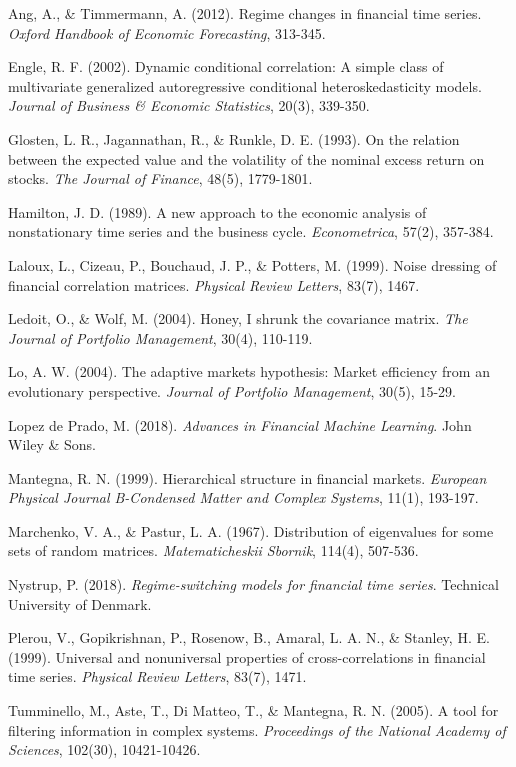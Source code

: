 \documentclass[
  12pt,
]{article}
\begin{document}
\begingroup
\setlength{\parindent}{-0.5in}
\setlength{\leftskip}{0.5in}
\setlength{\parskip}{8pt}

Ang, A., \& Timmermann, A. (2012). Regime changes in financial time
series. \emph{Oxford Handbook of Economic Forecasting}, 313-345.

Engle, R. F. (2002). Dynamic conditional correlation: A simple class of
multivariate generalized autoregressive conditional heteroskedasticity
models. \emph{Journal of Business \& Economic Statistics}, 20(3),
339-350.

Glosten, L. R., Jagannathan, R., \& Runkle, D. E. (1993). On the
relation between the expected value and the volatility of the nominal
excess return on stocks. \emph{The Journal of Finance}, 48(5),
1779-1801.

Hamilton, J. D. (1989). A new approach to the economic analysis of
nonstationary time series and the business cycle. \emph{Econometrica},
57(2), 357-384.

Laloux, L., Cizeau, P., Bouchaud, J. P., \& Potters, M. (1999). Noise
dressing of financial correlation matrices.
\emph{Physical Review Letters}, 83(7), 1467.

Ledoit, O., \& Wolf, M. (2004). Honey, I shrunk the covariance matrix.
\emph{The Journal of Portfolio Management}, 30(4), 110-119.

Lo, A. W. (2004). The adaptive markets hypothesis: Market efficiency
from an evolutionary perspective.
\emph{Journal of Portfolio Management}, 30(5), 15-29.

Lopez de Prado, M. (2018).
\emph{Advances in Financial Machine Learning}. John Wiley \& Sons.

Mantegna, R. N. (1999). Hierarchical structure in financial markets.
\emph{European Physical Journal B-Condensed Matter and Complex Systems},
11(1), 193-197.

Marchenko, V. A., \& Pastur, L. A. (1967). Distribution of eigenvalues
for some sets of random matrices. \emph{Matematicheskii Sbornik},
114(4), 507-536.

Nystrup, P. (2018).
\emph{Regime-switching models for financial time series}. Technical
University of Denmark.

Plerou, V., Gopikrishnan, P., Rosenow, B., Amaral, L. A. N., \& Stanley,
H. E. (1999). Universal and nonuniversal properties of
cross-correlations in financial time series.
\emph{Physical Review Letters}, 83(7), 1471.

Tumminello, M., Aste, T., Di Matteo, T., \& Mantegna, R. N. (2005). A
tool for filtering information in complex systems.
\emph{Proceedings of the National Academy of Sciences}, 102(30),
10421-10426.
\end{document}
